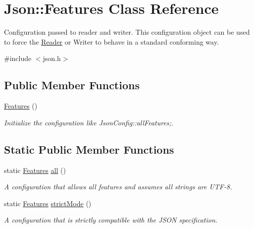 \hypertarget{classJson_1_1Features}{}\section{Json\+:\+:Features Class Reference}
\label{classJson_1_1Features}


Configuration passed to reader and writer. This configuration object can be used to force the \hyperlink{classJson_1_1Reader}{Reader} or Writer to behave in a standard conforming way.  




{\ttfamily \#include $<$json.\+h$>$}

\subsection*{Public Member Functions}
\begin{DoxyCompactItemize}
\item 
\mbox{\label{classJson_1_1Features_ad15a091cb61bb31323299a95970d2644}} 
\hyperlink{classJson_1_1Features_ad15a091cb61bb31323299a95970d2644}{Features} ()
\begin{DoxyCompactList}\small\item\em Initialize the configuration like Json\+Config\+::all\+Features;. \end{DoxyCompactList}\end{DoxyCompactItemize}
\subsection*{Static Public Member Functions}
\begin{DoxyCompactItemize}
\item 
static \hyperlink{classJson_1_1Features}{Features} \hyperlink{classJson_1_1Features_a63894da6e2c100b38741fa933f3d33ae}{all} ()
\begin{DoxyCompactList}\small\item\em A configuration that allows all features and assumes all strings are U\+T\+F-\/8. \end{DoxyCompactList}\item 
static \hyperlink{classJson_1_1Features}{Features} \hyperlink{classJson_1_1Features_ae23176c14b2e79e81fb61fb1a8ab58ee}{strict\+Mode} ()
\begin{DoxyCompactList}\small\item\em A configuration that is strictly compatible with the J\+S\+ON specification. \end{DoxyCompactList}\end{DoxyCompactItemize}
